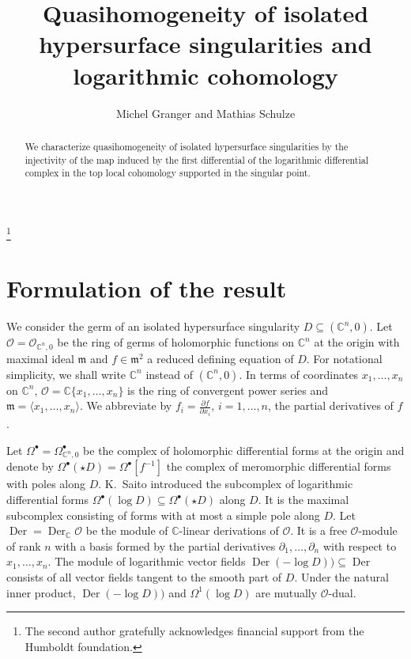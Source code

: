 \documentclass{amsart}
\theoremstyle{definition}
\theoremstyle{plain}
\theoremstyle{remark}
\newcommand{\m}{\mathfrak{m}}
\newcommand{\C}{\mathbb{C}}
\renewcommand{\O}{\mathcal{O}}
\DeclareMathOperator{\Der}{Der}
\begin{document}
\title[Quasihomogeneity of isolated hypersurface singularities]{
Quasihomogeneity of isolated hypersurface singularities and logarithmic cohomology}
\author{Michel Granger and Mathias Schulze}

\begin{abstract}
We characterize quasihomogeneity of isolated hypersurface singularities by the injectivity of the map induced by the first differential of the logarithmic differential complex in the top local cohomology supported in the singular point.
\end{abstract}

\thanks{The second author gratefully acknowledges financial support from the Humboldt foundation.}



\maketitle

\section{Formulation of the result}

We consider the germ of an isolated hypersurface singularity $D\subseteq(\C^n,0)$.
Let $\O=\O_{\C^n,0}$ be the ring of germs of holomorphic functions on $\C^n$ at the origin with maximal ideal $\m$ and $f\in\m^2$ a reduced defining equation of $D$.
For notational simplicity, we shall write $\C^n$ instead of $(\C^n,0)$.
In terms of coordinates $x_1,\dots,x_n$ on $\C^n$, $\O=\C\{x_1,\dots,x_n\}$ is the ring of convergent power series and $\m=\langle x_1,\dots,x_n\rangle$.
We abbreviate by $f_i=\frac{\partial f}{\partial{x_i}}$, $i=1,\dots,n$, the partial derivatives of $f$.

Let $\Omega^\bullet=\Omega_{\C^n,0}^\bullet$ be the complex of holomorphic differential forms at the origin and denote by $\Omega^\bullet(\star D)=\Omega^\bullet[f^{-1}]$ the complex of meromorphic differential forms with poles along $D$.
K.~Saito \cite[\S 1]{Sai80} introduced the subcomplex of logarithmic differential forms $\Omega^\bullet(\log D)\subseteq\Omega^\bullet(\star D)$ along $D$.
It is the maximal subcomplex consisting of forms with at most a simple pole along $D$.
Let $\Der=\Der_\C\O$ be the module of $\C$-linear derivations of $\O$.
It is a free $\O$-module of rank $n$ with a basis formed by the partial derivatives $\partial_1,\dots,\partial_n$ with respect to $x_1,\dots,x_n$.
The module of logarithmic vector fields $\Der(-\log D))\subseteq\Der$ consists of all vector fields tangent to the smooth part of $D$.
Under the natural inner product, $\Der(-\log D))$ and $\Omega^1(\log D)$ are mutually $\O$-dual.
\end{document}
